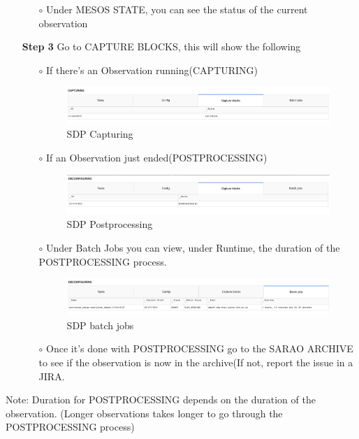 \begin{itemize}
\begin{itemize}
	\item[$\circ$] Under MESOS STATE, you can see the status of the current observation
\end{itemize}


\item[\textbf{Step 3}] Go to CAPTURE BLOCKS, this will show the following
\begin{itemize}
	\item[$\circ$] If there’s an Observation running(CAPTURING)


\begin{figure}[!thb]
	\centering
	\includegraphics[scale=0.23]{Chapters/images/image5.png}
	
	\caption{SDP Capturing}
	\label{fig:image5}
\end{figure}
\item[$\circ$] If an Observation just ended(POSTPROCESSING)

\begin{figure}[!thb]
	\centering
	\includegraphics[scale=0.23]{Chapters/images/image92.png}
	
	\caption{SDP Postprocessing}
	\label{fig:image92}
\end{figure}
\item[$\circ$] Under Batch Jobs you can view, under Runtime, the duration of the POSTPROCESSING process.

\begin{figure}[!thb]
	\centering
	\includegraphics[scale=0.23]{Chapters/images/image13.png}
	
	\caption{SDP batch jobs}
	\label{fig:image13}
\end{figure}
\item[$\circ$] Once it’s done with POSTPROCESSING go to the SARAO ARCHIVE to see if the observation is now in the archive(If not, report the issue in a JIRA.
\end{itemize}

\end{itemize}
Note: Duration for POSTPROCESSING depends on the duration of the observation. (Longer observations takes longer to go through the POSTPROCESSING process)






